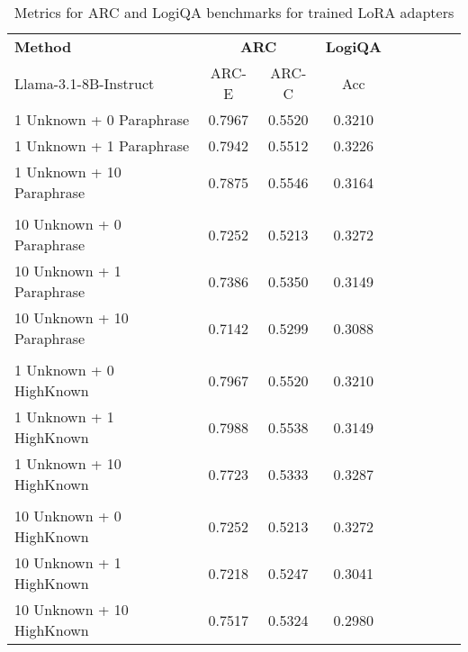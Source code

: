 \begin{table*}[!ht]
    \centering
    \footnotesize
    \setlength{\tabcolsep}{2pt}
\begin{tabular}{lcccccccc}
\toprule

{\textbf{Method}}            & \multicolumn{2}{c}{{\textbf{ARC}} } & {\textbf{LogiQA}} \\
{Llama-3.1-8B-Instruct}                      & { ARC-E}        & {ARC-C}     & { Acc}             \\ \midrule
{1 Unknown + 0 Paraphrase}   & {0.7967}       & {0.5520}     & {0.3210}           \\
{1 Unknown + 1 Paraphrase}   & {0.7942}       & {0.5512}    & {0.3226}          \\
{1 Unknown + 10 Paraphrase} & {0.7875}       & {0.5546}    & {0.3164}          \\ 
\midrule
                        &             &     &             \\ 
\midrule
{10 Unknown + 0 Paraphrase}  & {0.7252}       & {0.5213}    & {0.3272}          \\
{10 Unknown + 1 Paraphrase}  & {0.7386}       & {0.5350}     & {0.3149}          \\
{10 Unknown + 10 Paraphrase} & {0.7142}       & {0.5299}    & {0.3088}          \\ \midrule
                          &          &       &                \\ 
\midrule
{1 Unknown + 0 HighKnown}    & {0.7967}       & {0.5520}     & {0.3210}           \\
{1 Unknown + 1 HighKnown}    & {0.7988}       & {0.5538}    & {0.3149}          \\
{1 Unknown + 10 HighKnown}   & {0.7723}       & {0.5333}    & {0.3287}          \\ \hline
                          &             &     &             \\ 
\midrule
{10 Unknown + 0 HighKnown}   & {0.7252}       & {0.5213}    & {0.3272}          \\
{10 Unknown + 1 HighKnown}   & {0.7218}       & {0.5247}    & {0.3041}          \\
{10 Unknown + 10 HighKnown}  & {0.7517}       & {0.5324}    & {0.2980}           \\ 


\bottomrule
\end{tabular}                   
\caption{Metrics for ARC and LogiQA benchmarks for  trained LoRA adapters}
\label{extra_benchmarks}

\end{table*}